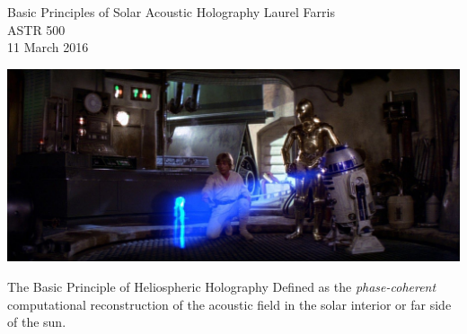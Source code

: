 \documentclass{beamer}
\begin{document}
\begin{frame}
    \begin{centering}
    {\Large Basic Principles of Solar Acoustic Holography}
    {\large\textcolor{cblue}{Laurel Farris}}\\
    {\large\textcolor{cblue}{ASTR 500}}\\
    {\textcolor{cblue}{11 March 2016}}\\
    \end{centering}
    \vspace{1cm}
    \includegraphics[width=\paperwidth]{starwars.jpg}
\end{frame}

\begin{frame}{The Basic Principle of Heliospheric Holography}
    Defined as the \emph{phase-coherent} computational
    reconstruction of the acoustic field in the solar interior
    or far side of the sun.
\end{frame}
\end{document}
